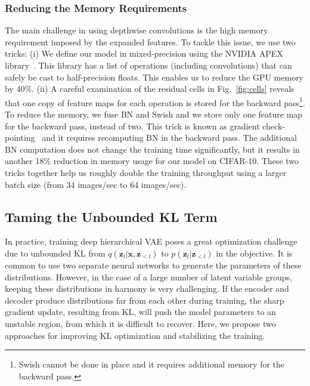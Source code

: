 \documentclass{article}
\newcommand{\x}{{\pmb{x}}}
\newcommand{\z}{{\pmb{z}}}
\begin{document}
\subsubsection{Reducing the Memory Requirements}
The main challenge in using depthwise convolutions is the high memory requirement imposed by the expanded features. To tackle this issue, we use two tricks: (i) We define our model in mixed-precision using the NVIDIA APEX library~\cite{apex}. This library has a list of operations (including convolutions) that can safely be cast to half-precision floats. This enables us to reduce the GPU memory by 40\%. (ii) A careful examination of the residual cells in Fig.~\ref{fig:cells} reveals that one copy of feature maps for each operation is stored for the backward pass\footnote{Swish cannot be done in place and it requires additional memory for the backward pass.}. To reduce the memory, we fuse BN and Swish and we store only one feature map for the backward pass, instead of two. This trick is known as gradient check-pointing~\cite{chen2016training, martens2012training} and it requires recomputing BN in the backward pass. The additional BN computation does not change the training time significantly, but it results in another 18\% reduction in memory usage for our model on CIFAR-10. These two tricks together help us roughly double the training throughput using a larger batch size (from 34 images/sec to 64 images/sec).


\subsection{Taming the Unbounded KL Term}\label{sec:nvae_kl}

In practice, training deep hierarchical VAE poses a great optimization challenge due to unbounded KL from $q(\z_l|\x, \z_{<l})$ to $p(\z_l|\z_{<l})$ in the objective. It is common to use two separate neural networks to generate the parameters of these distributions. However, in the case of a large number of latent variable groups, keeping these distributions in harmony is very challenging. If the encoder and decoder produce distributions far from each other during training, the sharp gradient update, resulting from KL, will push the model parameters to an unstable region, from which it is difficult to recover. Here, we propose two approaches for improving KL optimization and stabilizing the training.
\end{document}
